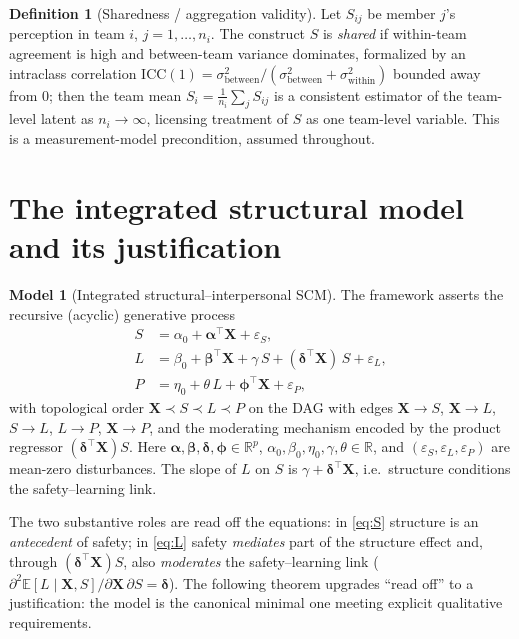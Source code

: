 \documentclass{amsart}
\theoremstyle{definition}
\newtheorem{definition}{Definition}
\newtheorem{model}{Model}
\theoremstyle{plain}
\begin{document}
\begin{definition}[Sharedness / aggregation validity]\label{def:shared}
Let $S_{ij}$ be member $j$'s perception in team $i$, $j=1,\dots,n_i$. The construct $S$ is
\emph{shared} if within-team agreement is high and between-team variance dominates,
formalized by an intraclass correlation
$\mathrm{ICC}(1)=\sigma^2_{\text{between}}/(\sigma^2_{\text{between}}+\sigma^2_{\text{within}})$
bounded away from $0$; then the team mean $S_i=\frac1{n_i}\sum_j S_{ij}$ is a consistent
estimator of the team-level latent as $n_i\to\infty$, licensing treatment of $S$ as one
team-level variable. This is a measurement-model precondition, assumed throughout.
\end{definition}

\section{The integrated structural model and its justification}

\begin{model}[Integrated structural--interpersonal SCM]\label{mod:main}
The framework asserts the recursive (acyclic) generative process
\begin{align}
S &= \alpha_0 + \bm\alpha^\top \bm X + \varepsilon_S, \label{eq:S}\\
L &= \beta_0 + \bm\beta^\top \bm X + \gamma\, S
      + (\bm\delta^\top \bm X)\, S + \varepsilon_L, \label{eq:L}\\
P &= \eta_0 + \theta\, L + \bm\phi^\top \bm X + \varepsilon_P, \label{eq:P}
\end{align}
with topological order $\bm X \prec S \prec L \prec P$ on the DAG with edges
$\bm X\to S$, $\bm X\to L$, $S\to L$, $L\to P$, $\bm X\to P$, and the moderating mechanism
encoded by the product regressor $(\bm\delta^\top\bm X)S$. Here
$\bm\alpha,\bm\beta,\bm\delta,\bm\phi\in\mathbb R^p$,
$\alpha_0,\beta_0,\eta_0,\gamma,\theta\in\mathbb R$, and $(\varepsilon_S,\varepsilon_L,
\varepsilon_P)$ are mean-zero disturbances. The slope of $L$ on $S$ is
$\gamma+\bm\delta^\top\bm X$, i.e.\ structure conditions the safety--learning link.
\end{model}

The two substantive roles are read off the equations: in \eqref{eq:S} structure is an
\emph{antecedent} of safety; in \eqref{eq:L} safety \emph{mediates} part of the structure
effect and, through $(\bm\delta^\top\bm X)S$, also \emph{moderates} the safety--learning link
($\partial^2 \mathbb E[L\mid\bm X,S]/\partial\bm X\,\partial S=\bm\delta$). The following
theorem upgrades ``read off'' to a justification: the model is the canonical minimal one
meeting explicit qualitative requirements.
\end{document}
